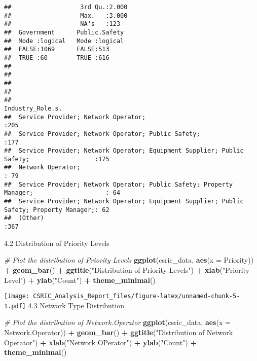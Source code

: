 \documentclass[
]{article}
\newenvironment{Shaded}{\begin{snugshade}}{\end{snugshade}}
\newcommand{\AttributeTok}[1]{\textcolor[rgb]{0.13,0.29,0.53}{#1}}
\newcommand{\CommentTok}[1]{\textcolor[rgb]{0.56,0.35,0.01}{\textit{#1}}}
\newcommand{\FunctionTok}[1]{\textcolor[rgb]{0.13,0.29,0.53}{\textbf{#1}}}
\newcommand{\NormalTok}[1]{#1}
\newcommand{\SpecialCharTok}[1]{\textcolor[rgb]{0.81,0.36,0.00}{\textbf{#1}}}
\newcommand{\StringTok}[1]{\textcolor[rgb]{0.31,0.60,0.02}{#1}}
\begin{document}
\begin{verbatim}
##                   3rd Qu.:2.000                                       
##                   Max.   :3.000                                       
##                   NA's   :123                                         
##  Government      Public.Safety  
##  Mode :logical   Mode :logical  
##  FALSE:1069      FALSE:513      
##  TRUE :60        TRUE :616      
##                                 
##                                 
##                                 
##                                 
##                                                                                  Industry_Role.s.
##  Service Provider; Network Operator;                                                     :205    
##  Service Provider; Network Operator; Public Safety;                                      :177    
##  Service Provider; Network Operator; Equipment Supplier; Public Safety;                  :175    
##  Network Operator;                                                                       : 79    
##  Service Provider; Network Operator; Public Safety; Property Manager;                    : 64    
##  Service Provider; Network Operator; Equipment Supplier; Public Safety; Property Manager;: 62    
##  (Other)                                                                                 :367
\end{verbatim}

4.2 Distribution of Priority Levels

\begin{Shaded}
\begin{Highlighting}[]
\CommentTok{\# Plot the distribution of Priority Levels}
\FunctionTok{ggplot}\NormalTok{(csric\_data, }\FunctionTok{aes}\NormalTok{(}\AttributeTok{x =}\NormalTok{ Priority)) }\SpecialCharTok{+} 
  \FunctionTok{geom\_bar}\NormalTok{() }\SpecialCharTok{+} 
  \FunctionTok{ggtitle}\NormalTok{(}\StringTok{"Distribution of Priority Levels"}\NormalTok{) }\SpecialCharTok{+}
  \FunctionTok{xlab}\NormalTok{(}\StringTok{"Priority Level"}\NormalTok{) }\SpecialCharTok{+}
  \FunctionTok{ylab}\NormalTok{(}\StringTok{"Count"}\NormalTok{) }\SpecialCharTok{+}
  \FunctionTok{theme\_minimal}\NormalTok{()}
\end{Highlighting}
\end{Shaded}

\texttt{[image: CSRIC\_Analysis\_Report\_files/figure-latex/unnamed-chunk-5-1.pdf]}
4.3 Network Type Distribution

\begin{Shaded}
\begin{Highlighting}[]
\CommentTok{\# Plot the distribution of Network.Operator}
\FunctionTok{ggplot}\NormalTok{(csric\_data, }\FunctionTok{aes}\NormalTok{(}\AttributeTok{x =}\NormalTok{ Network.Operator)) }\SpecialCharTok{+} 
  \FunctionTok{geom\_bar}\NormalTok{() }\SpecialCharTok{+} 
  \FunctionTok{ggtitle}\NormalTok{(}\StringTok{"Distribution of Network Operator"}\NormalTok{) }\SpecialCharTok{+}
  \FunctionTok{xlab}\NormalTok{(}\StringTok{"Network OPerator"}\NormalTok{) }\SpecialCharTok{+}
  \FunctionTok{ylab}\NormalTok{(}\StringTok{"Count"}\NormalTok{) }\SpecialCharTok{+}
  \FunctionTok{theme\_minimal}\NormalTok{()}
\end{Highlighting}
\end{Shaded}
\end{document}
